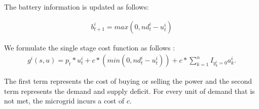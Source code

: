 The battery information is updated as follows:

\begin{align}
b_{t+1}^{i} = max(0,nd_{t}^{i} - u_{t}^{i})
\end{align}

We formulate the single stage cost function as follows :
\begin{align}
g^{i}(s,u) = p_{t}*u_{t}^{i} + c*(min(0,nd_{t}^{i} - u_{t}^{i})) + c* \sum_{k =1}^{n} I_{y_{k}^{i} = 0} a_{k}^{i}.
\end{align}

The first term represents the cost of buying or selling the power and the second term represents the demand and supply deficit. For every unit of demand that is not met, the microgrid incurs a cost of $c$. 

